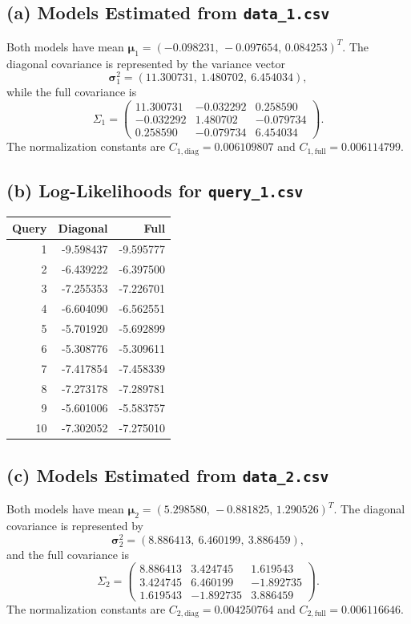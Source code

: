 \documentclass[11pt]{article}
\begin{document}
\subsection*{(a) Models Estimated from \texttt{data\_1.csv}}

Both models have mean $\boldsymbol\mu_1=(-0.098231,\,-0.097654,\,0.084253)^T$.
The diagonal covariance is represented by the variance vector
\[
\boldsymbol\sigma_1^2=(11.300731,\ 1.480702,\ 6.454034),
\]
while the full covariance is
\[
\Sigma_1=\begin{pmatrix}
11.300731 & -0.032292 & 0.258590\\
-0.032292 & 1.480702 & -0.079734\\
0.258590 & -0.079734 & 6.454034
\end{pmatrix}.
\]
The normalization constants are $C_{1,\mathrm{diag}}=0.006109807$ and $C_{1,\mathrm{full}}=0.006114799$.

\subsection*{(b) Log-Likelihoods for \texttt{query\_1.csv}}

\begin{center}
\begin{tabular}{rrr}
\toprule
Query & Diagonal & Full \\
\midrule
1  & -9.598437 & -9.595777 \\
2  & -6.439222 & -6.397500 \\
3  & -7.255353 & -7.226701 \\
4  & -6.604090 & -6.562551 \\
5  & -5.701920 & -5.692899 \\
6  & -5.308776 & -5.309611 \\
7  & -7.417854 & -7.458339 \\
8  & -7.273178 & -7.289781 \\
9  & -5.601006 & -5.583757 \\
10 & -7.302052 & -7.275010 \\
\bottomrule
\end{tabular}
\end{center}

\subsection*{(c) Models Estimated from \texttt{data\_2.csv}}

Both models have mean $\boldsymbol\mu_2=(5.298580,\,-0.881825,\,1.290526)^T$.
The diagonal covariance is represented by
\[
\boldsymbol\sigma_2^2=(8.886413,\ 6.460199,\ 3.886459),
\]
and the full covariance is
\[
\Sigma_2=\begin{pmatrix}
8.886413 & 3.424745 & 1.619543\\
3.424745 & 6.460199 & -1.892735\\
1.619543 & -1.892735 & 3.886459
\end{pmatrix}.
\]
The normalization constants are $C_{2,\mathrm{diag}}=0.004250764$ and $C_{2,\mathrm{full}}=0.006116646$.
\end{document}
